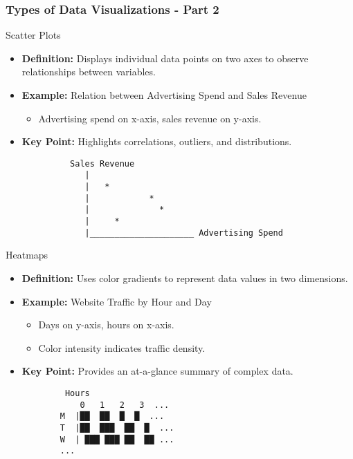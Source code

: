 \documentclass[aspectratio=169]{beamer}
\begin{document}
\begin{frame}[fragile]
    \frametitle{Types of Data Visualizations - Part 2}
    \begin{block}{Scatter Plots}
        \begin{itemize}
            \item \textbf{Definition:} Displays individual data points on two axes to observe relationships between variables.
            \item \textbf{Example:} Relation between Advertising Spend and Sales Revenue
            \begin{itemize}
                \item Advertising spend on x-axis, sales revenue on y-axis.
            \end{itemize}
            \item \textbf{Key Point:} Highlights correlations, outliers, and distributions.
        \end{itemize}
        \begin{lstlisting}
             Sales Revenue
                |
                |   *
                |            *
                |              *
                |     *
                |_____________________ Advertising Spend
        \end{lstlisting}
    \end{block}

    \begin{block}{Heatmaps}
        \begin{itemize}
            \item \textbf{Definition:} Uses color gradients to represent data values in two dimensions.
            \item \textbf{Example:} Website Traffic by Hour and Day
            \begin{itemize}
                \item Days on y-axis, hours on x-axis.
                \item Color intensity indicates traffic density.
            \end{itemize}
            \item \textbf{Key Point:} Provides an at-a-glance summary of complex data.
        \end{itemize}
        \begin{lstlisting}
            Hours
               0   1   2   3  ...
           M  |██  ██  █  █  ...
           T  |██  ███  ██  █  ...
           W  | ███ ███ ██  ██ ...
           ...
        \end{lstlisting}
    \end{block}
\end{frame}
\end{document}
